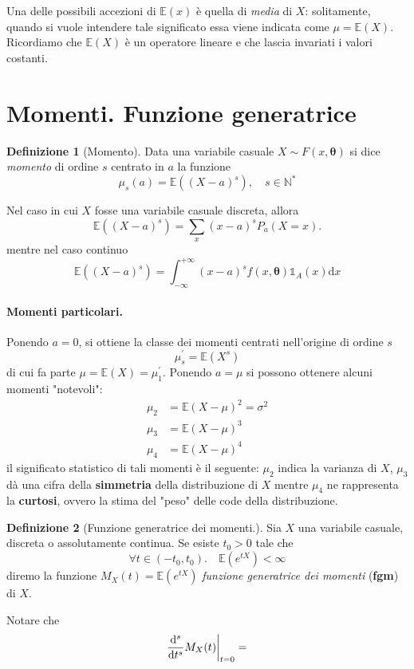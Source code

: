 \documentclass[fontsize=11pt,paper=A4,oneside,index=totoc,hyperref]{book}
\theoremstyle{definition}
\newtheorem{dfn}{Definizione}[]
\theoremstyle{plain}
\newcommand{\Asp}{\mathbb{E}}
\newcommand{\Ind}{\mathbb{1}}
\newcommand\restr[2]{{%
  \left.\kern-\nulldelimiterspace %
  #1 %
  \vphantom{\big|} %
  \right|_{#2} %
  }}
\begin{document}
Una delle possibili accezioni di \(\Asp(x)\) è quella di \emph{media} di \(X\): solitamente, quando si vuole intendere tale significato essa viene indicata come \(\mu = \Asp(X)\). Ricordiamo che \(\Asp(X)\) è un operatore lineare e che lascia invariati i valori costanti.


\section{Momenti. Funzione generatrice}
\begin{dfn}[Momento]
  Data una variabile casuale \(X \sim F(x, {\boldsymbol{\theta}})\) si dice \emph{momento} di ordine \(s\) centrato in \(a\) la funzione
  \[
  \mu_s(a) = \Asp((X - a)^s),\quad s \in \mathbb{N}^{*}
  \]
\end{dfn}
Nel caso in cui \(X\) fosse una variabile casuale discreta, allora
\[
\Asp((X-a)^s) = \sum_{x}(x-a)^sP_a(X = x).
\]
mentre nel caso continuo
\[
\Asp((X-a)^s) = \int_{-\infty}^{+\infty}(x-a)^s f(x, {\boldsymbol{\theta}}) \Ind_A(x)\mathrm{d}x
\]

\paragraph{Momenti particolari.} Ponendo \(a = 0\), si ottiene la classe dei momenti centrati nell'origine di ordine \(s\)
\[
\mu_s^\prime = \Asp(X^s)
\]
di cui fa parte \(\mu = \Asp(X) = \mu_1^\prime\). Ponendo \(a = \mu\) si possono ottenere alcuni momenti "notevoli":
\begin{align*}
  \mu_2 &= \Asp(X - \mu)^2 = \sigma^2 \\
  \mu_3 &= \Asp(X - \mu)^3 \\
  \mu_4 &= \Asp(X - \mu)^4
\end{align*}
il significato statistico di tali momenti è il seguente: \(\mu_2\) indica la varianza di \(X\), \(\mu_3\) dà una cifra della {\bf simmetria} della distribuzione di \(X\) mentre \(\mu_4\) ne rappresenta la {\bf curtosi}, ovvero la stima del "peso" delle code della distribuzione.

\begin{dfn}[Funzione generatrice dei momenti.]
  Sia \(X\) una variabile casuale, discreta o assolutamente continua. Se esiste \(t_0 > 0\) tale che
  \begin{equation}
    \forall t \in (-t_0,t_0).\quad \Asp(e^{tX}) < \infty
  \end{equation}
  diremo la funzione \(M_X(t) = \Asp(e^{tX})\) \emph{funzione generatrice dei momenti} ({\bf fgm}) di \(X\).
\end{dfn}
Notare che
\begin{equation}
  \restr{\frac{\mathrm{d}^s}{\mathrm{d}t^s}M_X(t)}{t=0} =
\end{equation}
\end{document}
